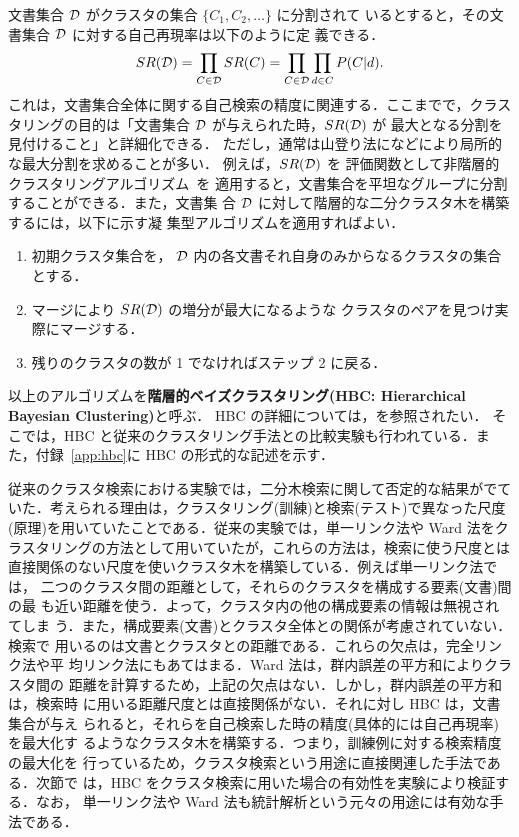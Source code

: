 文書集合 ${\cal D}$ がクラスタの集合 $\{C_1, C_2, \ldots\}$ に分割されて
いるとすると，その文書集合 ${\cal D}$ に対する自己再現率は以下のように定
義できる．
\begin{equation}
  SR({\cal D}) = \prod_{C \in {\cal D}} SR(C)
	      = \prod_{C \in {\cal D}} \prod_{d \in C} P(C|d).
\end{equation}
これは，文書集合全体に関する自己検索の精度に関連する．ここまでで，クラス
タリングの目的は「文書集合 ${\cal D}$ が与えられた時，$SR({\cal D})$ が
最大となる分割を見付けること」と詳細化できる．
ただし，通常は山登り法になどにより局所的な最大分割を求めることが多い．
例えば，$SR({\cal D})$ を
評価関数として非階層的クラスタリングアルゴリズム~\cite{anderberg:73:a}を
適用すると，文書集合を平坦なグループに分割することができる．また，文書集
合 ${\cal D}$ に対して階層的な二分クラスタ木を構築するには，以下に示す凝
集型アルゴリズムを適用すればよい．
\begin{enumerate}
  \item 初期クラスタ集合を，
	${\cal D}$ 内の各文書それ自身のみからなるクラスタの集合とする．
  \item マージにより $SR({\cal D})$ の増分が最大になるような
	クラスタのペアを見つけ実際にマージする．
  \item 残りのクラスタの数が 1 でなければステップ 2 に戻る．
\end{enumerate}
以上のアルゴリズムを{\gt\bf 階層的ベイズクラスタリング(HBC: Hierarchical
Bayesian Clustering)}と呼ぶ．
HBC の詳細については，\cite{iwayama:95:b,iwayama:95:a}を参照されたい．
そこでは，HBC と従来のクラスタリング手法との比較実験も行われている．ま
た，付録~\ref{app:hbc}に HBC の形式的な記述を示す．

従来のクラスタ検索における実験では，二分木検索に関して否定的な結果がでて
いた．考えられる理由は，クラスタリング(訓練)と検索(テスト)で異なった尺度
(原理)を用いていたことである．従来の実験では，単一リンク法や Ward 法をク
ラスタリングの方法として用いていたが，これらの方法は，検索に使う尺度とは
直接関係のない尺度を使いクラスタ木を構築している．例えば単一リンク法では，
二つのクラスタ間の距離として，それらのクラスタを構成する要素(文書)間の最
も近い距離を使う．よって，クラスタ内の他の構成要素の情報は無視されてしま
う．また，構成要素(文書)とクラスタ全体との関係が考慮されていない．検索で
用いるのは文書とクラスタとの距離である．これらの欠点は，完全リンク法や平
均リンク法にもあてはまる．Ward 法は，群内誤差の平方和によりクラスタ間の
距離を計算するため，上記の欠点はない．しかし，群内誤差の平方和は，検索時
に用いる距離尺度とは直接関係がない．それに対し HBC は，文書集合が与え
られると，それらを自己検索した時の精度(具体的には自己再現率)を最大化す
るようなクラスタ木を構築する．つまり，訓練例に対する検索精度の最大化を
行っているため，クラスタ検索という用途に直接関連した手法である．次節で
は，HBC をクラスタ検索に用いた場合の有効性を実験により検証する．なお，
単一リンク法や Ward 法も統計解析という元々の用途には有効な手法である．

